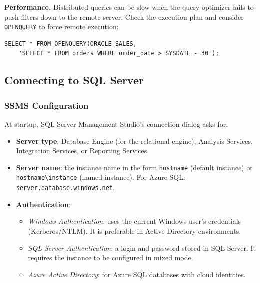 \begin{notebox}
\textbf{Performance.}
Distributed queries can be slow when the query optimizer fails to push filters down to the remote server. Check the execution plan and consider \texttt{OPENQUERY} to force remote execution:
\begin{lstlisting}
SELECT * FROM OPENQUERY(ORACLE_SALES,
    'SELECT * FROM orders WHERE order_date > SYSDATE - 30');
\end{lstlisting}
\end{notebox}

\subsection{Connecting to SQL Server}
\label{sec:sql-server-connection}

\subsubsection{SSMS Configuration}
\label{subsec:ssms-connection}

At startup, SQL Server Management Studio's connection dialog asks for:

\begin{itemize}
    \item \textbf{Server type}: Database Engine (for the relational engine), Analysis Services, Integration Services, or Reporting Services.

    \item \textbf{Server name}: the instance name in the form \texttt{hostname} (default instance) or \texttt{hostname\textbackslash instance} (named instance). For Azure SQL: \texttt{server.database.windows.net}.

    \item \textbf{Authentication}:
    \begin{itemize}
        \item \textit{Windows Authentication}: uses the current Windows user's credentials (Kerberos/NTLM). It is preferable in Active Directory environments.
        \item \textit{SQL Server Authentication}: a login and password stored in SQL Server. It requires the instance to be configured in mixed mode.
        \item \textit{Azure Active Directory}: for Azure SQL databases with cloud identities.
    \end{itemize}
\end{itemize}

